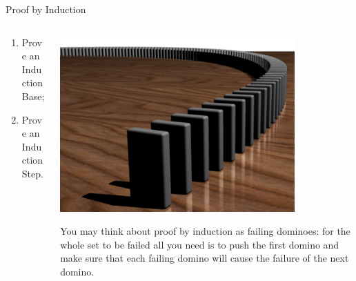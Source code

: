 \documentclass[9pt,aspectratio=169]{beamer}
\begin{document}
\begin{frame}{Proof by Induction}
\begin{columns}[T]
\begin{column}{0.5\textwidth}
      \begin{enumerate}
        \item Prove an Induction Base;
        \item Prove an Induction Step.
      \end{enumerate}\pause
    \end{column}
    \begin{column}{0.5\textwidth}
      \begin{center}
        \vspace*{-\intextsep}
        \includegraphics[width=0.8\textwidth]{20 - Induction/Dominoeffect.png}
      \end{center}
      You may think about proof by induction as failing dominoes: for the whole set to be failed all you need is to push the first domino and make sure that each failing domino will cause the failure of the next domino. 
    \end{column}
  \end{columns}
\end{frame}
\end{document}
